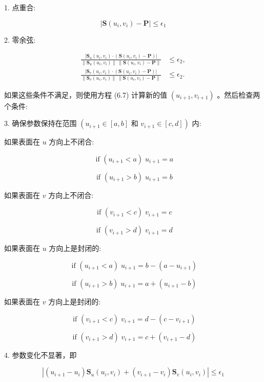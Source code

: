 \documentclass[../main.tex]{subfiles}
\begin{document}
1. 点重合:

\[
\left| {\mathbf{S}\left( {{u}_{i},{v}_{i}}\right)  - \mathbf{P}}\right|  \leq  {\epsilon }_{1}
\]

2. 零余弦:

\[
\begin{aligned}
\frac{|\mathbf S_u(u_i,v_i)\cdot(\mathbf S(u_i,v_i)-\mathbf P)|}{\|\mathbf S_u(u_i,v_i)\|\,\|\mathbf S(u_i,v_i)-\mathbf P\|}&\le\epsilon_2,\\
\frac{|\mathbf S_v(u_i,v_i)\cdot(\mathbf S(u_i,v_i)-\mathbf P)|}{\|\mathbf S_v(u_i,v_i)\|\,\|\mathbf S(u_i,v_i)-\mathbf P\|}&\le\epsilon_2.
\end{aligned}
\]

如果这些条件不满足，则使用方程 (6.7) 计算新的值 \(\left( {{u}_{i + 1},{v}_{i + 1}}\right)\) 。然后检查两个条件:

3. 确保参数保持在范围 \(\left( {{u}_{i + 1} \in  \left\lbrack  {a,b}\right\rbrack  }\right.\) 和 \(\left. {{v}_{i + 1} \in  \left\lbrack  {c,d}\right\rbrack  }\right)\) 内:

如果表面在 \(u\) 方向上不闭合:

\[
\text{ if }\left( {{u}_{i + 1} < a}\right) \;{u}_{i + 1} = a
\]

\[
\text{ if }\left( {{u}_{i + 1} > b}\right) \;{u}_{i + 1} = b
\]

如果表面在 \(v\) 方向上不闭合:

\[
\text{ if }\left( {{v}_{i + 1} < c}\right) \;{v}_{i + 1} = c
\]

\[
\text{ if }\left( {{v}_{i + 1} > d}\right) \;{v}_{i + 1} = d
\]

如果表面在 \(u\) 方向上是封闭的:

\[
\text{ if }\left( {{u}_{i + 1} < a}\right) \;{u}_{i + 1} = b - \left( {a - {u}_{i + 1}}\right)
\]

\[
\text{ if }\left( {{u}_{i + 1} > b}\right) \;{u}_{i + 1} = a + \left( {{u}_{i + 1} - b}\right)
\]

如果表面在 \(v\) 方向上是封闭的:

\[
\text{ if }\left( {{v}_{i + 1} < c}\right) \;{v}_{i + 1} = d - \left( {c - {v}_{i + 1}}\right)
\]

\[
\text{ if }\left( {{v}_{i + 1} > d}\right) \;{v}_{i + 1} = c + \left( {{v}_{i + 1} - d}\right)
\]

4. 参数变化不显著，即

\[
\left| {\left( {{u}_{i + 1} - {u}_{i}}\right) {\mathbf{S}}_{u}\left( {{u}_{i},{v}_{i}}\right)  + \left( {{v}_{i + 1} - {v}_{i}}\right) {\mathbf{S}}_{v}\left( {{u}_{i},{v}_{i}}\right) }\right|  \leq  {\epsilon }_{1}
\]
\end{document}
